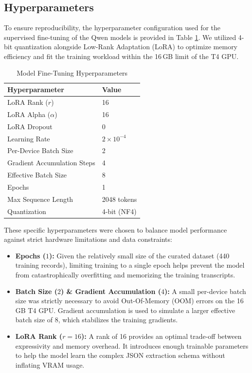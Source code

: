 \documentclass[unnumsec,webpdf,modern,large]{oup-authoring-template}%
\theoremstyle{thmstyleone}%
\theoremstyle{thmstyletwo}%
\theoremstyle{thmstylethree}%
\begin{document}
\subsection{Hyperparameters}
To ensure reproducibility, the hyperparameter configuration used for the supervised fine-tuning of the Qwen models is provided in Table \ref{tab:hyperparameters}. We utilized 4-bit quantization alongside Low-Rank Adaptation (LoRA) \cite{hu2022lora} to optimize memory efficiency and fit the training workload within the 16\,GB limit of the T4 GPU.

\begin{table}[h]
\centering
\caption{Model Fine-Tuning Hyperparameters}
\begin{tabular}{@{}ll@{}}
\toprule
\textbf{Hyperparameter} & \textbf{Value} \\
\midrule
LoRA Rank ($r$) & 16 \\
LoRA Alpha ($\alpha$) & 16 \\
LoRA Dropout & 0 \\
Learning Rate & $2 \times 10^{-4}$ \\
Per-Device Batch Size & 2 \\
Gradient Accumulation Steps & 4 \\
Effective Batch Size & 8 \\
Epochs & 1 \\
Max Sequence Length & 2048 tokens \\
Quantization & 4-bit (NF4) \\
\bottomrule
\end{tabular}
\label{tab:hyperparameters}
\end{table}

These specific hyperparameters were chosen to balance model performance against strict hardware limitations and data constraints:
\begin{itemize}
    \item \textbf{Epochs ($1$):} Given the relatively small size of the curated dataset (440 training records), limiting training to a single epoch helps prevent the model from catastrophically overfitting and memorizing the training transcripts.
    \item \textbf{Batch Size ($2$) \& Gradient Accumulation ($4$):} A small per-device batch size was strictly necessary to avoid Out-Of-Memory (OOM) errors on the 16\,GB T4 GPU. Gradient accumulation is used to simulate a larger effective batch size of 8, which stabilizes the training gradients.
    \item \textbf{LoRA Rank ($r{=}16$):} A rank of 16 provides an optimal trade-off between expressivity and memory overhead. It introduces enough trainable parameters to help the model learn the complex JSON extraction schema without inflating VRAM usage.
\end{itemize}
\end{document}
